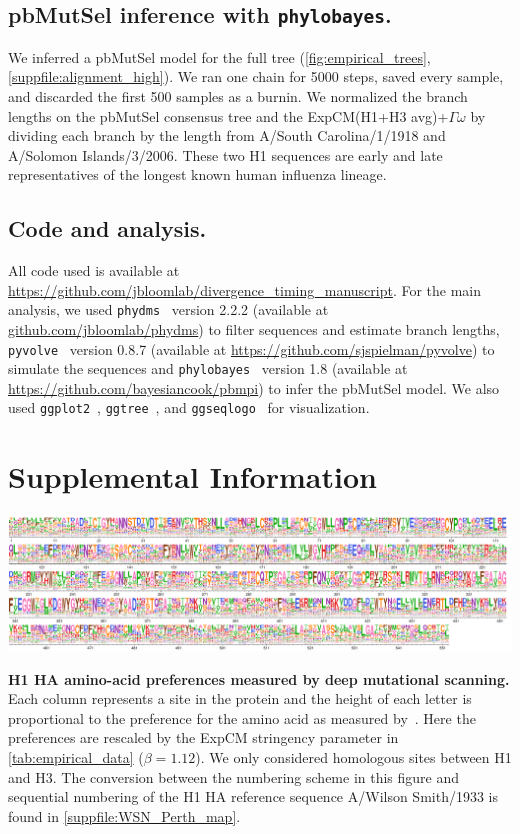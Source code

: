 \documentclass[11pt]{article}
\begin{document}
\subsection*{pbMutSel inference with \texttt{phylobayes}.}

We inferred a pbMutSel model for the full tree (\ref{fig:empirical_trees}, \ref{suppfile:alignment_high}). 
We ran one chain for 5000 steps, saved every sample, and discarded the first 500 samples as a burnin. 
We normalized the branch lengths on the pbMutSel consensus tree and the ExpCM(H1+H3 avg)+$\Gamma\omega$ by dividing each branch by the length from A/South Carolina/1/1918 and A/Solomon Islands/3/2006. 
These two H1 sequences are early and late representatives of the longest known human influenza lineage. 

\subsection*{Code and analysis.}
All code used is available at \url{https://github.com/jbloomlab/divergence_timing_manuscript}. 
For the main analysis, we used \texttt{phydms}~\citep{hilton2017phydms} version 2.2.2 (available at \url{github.com/jbloomlab/phydms}) to filter sequences and estimate branch lengths, \texttt{pyvolve}~\citep{spielman2015pyvolve} version 0.8.7 (available at \url{https://github.com/sjspielman/pyvolve}) to simulate the sequences and \texttt{phylobayes}~\citep{rodrigue2014site} version 1.8 (available at \url{https://github.com/bayesiancook/pbmpi}) to infer the pbMutSel model. We also used \texttt{ggplot2}~\citep{wickham2016ggplot2}, \texttt{ggtree}~\citep{yu2017ggtree}, and \texttt{ggseqlogo}~\citep{wagih2017ggseqlogo} for visualization.



\newpage
\section*{Supplemental Information}

\begin{suppfig}[H]
\centerline{\includegraphics[width=\textwidth]{figures/prefs_doud}}
\caption{\label{suppfig:prefs_doud}
\textbf{H1 HA amino-acid preferences measured by deep mutational scanning.}
Each column represents a site in the protein and the height of each letter is proportional to the preference for the amino acid as measured by~\citet{doud2016accurate}. 
Here the preferences are rescaled by the ExpCM stringency parameter in \ref{tab:empirical_data} ($\beta=1.12$). 
We only considered homologous sites between H1 and H3. 
The conversion between the numbering scheme in this figure and sequential numbering of the H1 HA reference sequence A/Wilson Smith/1933 is found in \ref{suppfile:WSN_Perth_map}. 
}
\end{suppfig}
\end{document}
